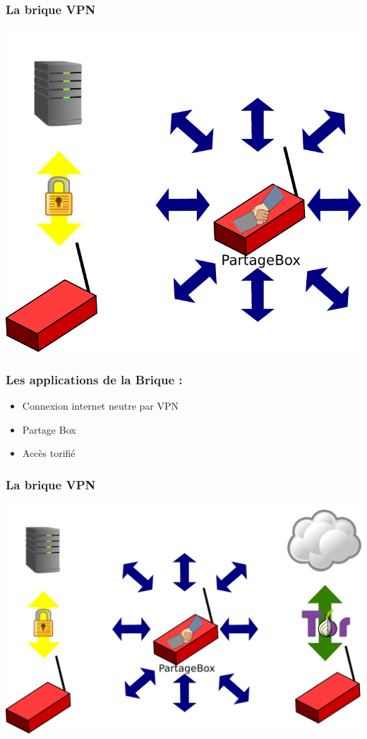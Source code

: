 \documentclass[notes=hide]{beamer}
\begin{document}
\begin{frame}[t]
\frametitle{\textcolor{titre}{La brique VPN}}
\vfill
\begin{center}
\includegraphics[scale=0.5]{img2/vpnpirate.pdf}
\end{center}
\end{frame}

\begin{frame}[t]
\frametitle{\textcolor{titre}{Les applications de la Brique :}}
\vfill
\begin{center}
\begin{itemize}
    \item Connexion internet neutre par VPN
    \item Partage Box
    \item Accès torifié
\end{itemize}
\end{center}
\end{frame}

\begin{frame}[t]
\frametitle{\textcolor{titre}{La brique VPN}}
\vfill
\begin{center}
\includegraphics[scale=0.5]{img2/vpnpirator.pdf}
\end{center}
\end{frame}
\end{document}
